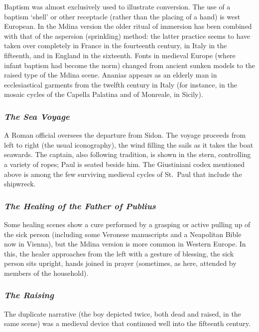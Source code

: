 \documentclass[a4paper,12pt]{article}
\begin{document}
Baptism was almost exclusively used to illustrate conversion.  The use
of a baptism `shell' or other receptacle (rather than the placing of a
hand) is west European. In the Mdina version the older ritual of
immersion has been combined with that of the aspersion (sprinkling)
method: the latter practice seems to have taken over completely in
France in the fourteenth century, in Italy in the fifteenth, and in
England in the sixteenth. Fonts in medieval Europe (where infant
baptism had become the norm) changed from ancient sunken models to the
raised type of the Mdina scene. Ananias appears as an elderly man in
ecclesiastical garments from the twelfth century in Italy (for
instance, in the mosaic cycles of the Capella Palatina and of
Monreale, in Sicily).

\subsubsection*{\textit{The Sea Voyage}}

A Roman official oversees the departure from Sidon. The voyage
proceeds from left to right (the usual iconography), the wind filling
the sails as it takes the boat seawards.  The captain, also following
tradition, is shown in the stern, controlling a variety of ropes; Paul
is seated beside him. The Giustiniani codex mentioned above is among
the few surviving medieval cycles of St.~Paul that include the
shipwreck.


\subsubsection*{\textit{The Healing of the Father of Publius}}

Some healing scenes show a cure performed by a grasping or active
pulling up of the sick person (including some Veronese manuscripts and
a Neapolitan Bible now in Vienna), but the Mdina version is more
common in Western Europe.  In this, the healer approaches from the
left with a gesture of blessing, the sick person sits upright, hands
joined in prayer (sometimes, as here, attended by members of the
household).

\subsubsection*{\textit{The Raising}}

The duplicate narrative (the boy depicted twice, both dead and raised,
in the same scene) was a medieval device that continued well into the
fifteenth century.
\end{document}
